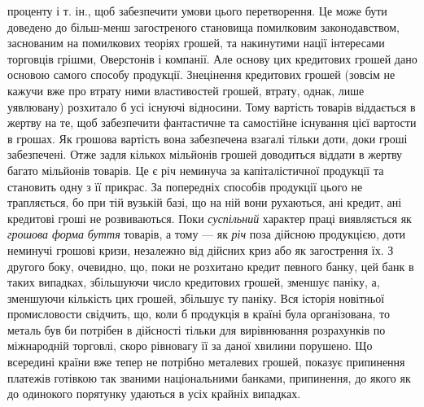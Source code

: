 \parcont{}  %
проценту і т. ін., щоб забезпечити умови цього перетворення. Це може бути
доведено до більш-менш загостреного становища помилковим законодавством,
заснованим на помилкових теоріях грошей, та накинутими нації інтересами
торговців грішми, Оверстонів і компанії. Але основу цих кредитових грошей
дано основою самого способу продукції. Знецінення кредитових грошей
(зовсім не кажучи вже про втрату ними властивостей грошей, втрату, однак, лише
уявлювану) розхитало б усі існуючі відносини. Тому вартість товарів віддається
в жертву на те, щоб забезпечити фантастичне та самостійне існування цієї вартости
в грошах. Як грошова вартість вона забезпечена взагалі тільки доти, доки
гроші забезпечені. Отже задля кількох мільйонів грошей доводиться віддати в жертву
багато мільйонів товарів. Це є річ неминуча за капіталістичної продукції та становить
одну з її прикрас. За попередніх способів продукції цього не трапляється, бо
при тій вузькій базі, що на ній вони рухаються, ані кредит, ані кредитові гроші не
розвиваються. Поки \emph{суспільний} характер праці виявляється як \emph{грошова форма}
\emph{буття} товарів, а тому — як \emph{річ} поза дійсною продукцією, доти неминучі грошові
кризи, незалежно від дійсних криз або як загострення їх. З другого
боку, очевидно, що, поки не розхитано кредит певного банку, цей банк в таких
випадках, збільшуючи число кредитових грошей, зменшує паніку, а, зменшуючи
кількість цих грошей, збільшує ту паніку. Вся історія новітньої промисловости
свідчить, що, коли б продукція в країні була організована, то металь був би
потрібен в дійсності тільки для вирівнювання розрахунків по міжнародній торговлі,
скоро рівновагу її за даної хвилини порушено. Що всередині країни вже тепер
не потрібно металевих грошей, показує припинення платежів готівкою так званими
національними банками, припинення, до якого як до одинокого порятунку удаються
в усіх крайніх випадках.

